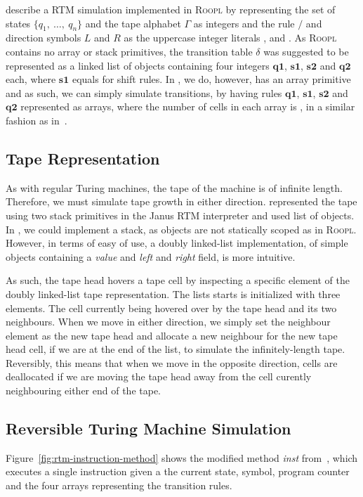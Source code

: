 \citeauthor{th:roopl} describe a RTM simulation implemented in \textsc{Roopl} by representing the set of states $\{q_1,\ \dots,\ q_n\}$ and the tape alphabet $\Gamma$ as integers and the rule $/$ and direction symbols $L$ and $R$ as the uppercase integer literals ,  and . As \textsc{Roopl} contains no array or stack primitives, the transition table $\delta$ was suggested to be represented as a linked list of objects containing four integers ${\textbf{q1}}$, ${\textbf{s1}}$, ${\textbf{s2}}$ and ${\textbf{q2}}$ each, where ${\textbf{s1}}$ equals  for shift rules. In \rooplpp, we do, however, has an array primitive and as such, we can simply simulate transitions, by having rules ${\textbf{q1}}$, ${\textbf{s1}}$, ${\textbf{s2}}$ and ${\textbf{q2}}$ represented as arrays, where the number of cells in each array is , in a similar fashion as in~\cite{ty:ejanus}.

\subsection{Tape Representation}
\label{subsec:tape-representation}
As with regular Turing machines, the tape of the machine is of infinite length. Therefore, we must simulate tape growth in either direction.
\citeauthor{ty:ejanus} represented the tape using two stack primitives in the Janus RTM interpreter and \citeauthor{th:roopl} used list of objects. In \rooplpp, we could implement a stack, as objects are not statically scoped as in \textsc{Roopl}. However, in terms of easy of use, a doubly linked-list implementation, of simple objects containing a \textit{value} and \textit{left} and \textit{right} field, is more intuitive.

As such, the tape head hovers a tape cell by inspecting a specific element of the doubly linked-list tape representation. The lists starts is initialized with three elements. The cell currently being hovered over by the tape head and its two neighbours. When we move in either direction, we simply set the neighbour element as the new tape head and allocate a new neighbour for the new tape head cell, if we are at the end of the list, to simulate the infinitely-length tape. Reversibly, this means that when we move in the opposite direction, cells are deallocated if we are moving the tape head away from the cell curently neighbouring either end of the tape.


\subsection{Reversible Turing Machine Simulation}
\label{subsec:rtm-simulation}
Figure~\ref{fig:rtm-instruction-method} shows the modified method \textit{inst} from~\cite{ty:ejanus}, which executes a single instruction given a the current state, symbol, program counter and the four arrays representing the transition rules. 

